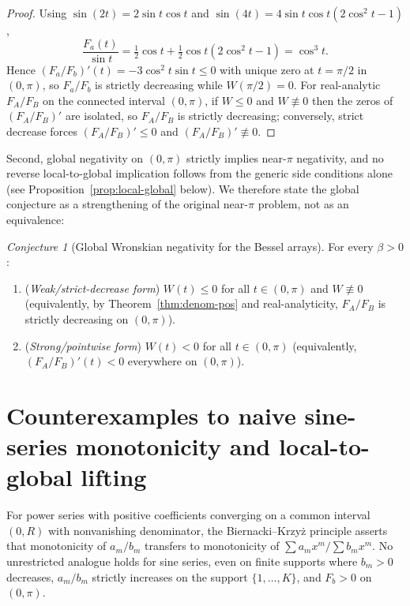 \documentclass[11pt]{article}
\theoremstyle{remark}
\newtheorem{conjecture}[theorem]{Conjecture}
\begin{document}
\begin{proof}
Using $\sin(2t) = 2\sin t\cos t$ and $\sin(4t) = 4\sin t\cos t(2\cos^2 t - 1)$,
\[
\frac{F_a(t)}{\sin t}
= \tfrac{1}{2}\cos t + \tfrac{1}{2}\cos t(2\cos^2 t - 1) = \cos^3 t.
\]
Hence $(F_a/F_b)'(t) = -3\cos^2 t\sin t \le 0$ with unique zero at $t = \pi/2$ in $(0,\pi)$,
so $F_a/F_b$ is strictly decreasing while $W(\pi/2)=0$. For real-analytic $F_A/F_B$ on the
connected interval $(0,\pi)$, if $W \le 0$ and $W \not\equiv 0$ then the zeros of
$(F_A/F_B)'$ are isolated, so $F_A/F_B$ is strictly decreasing; conversely, strict decrease
forces $(F_A/F_B)' \le 0$ and $(F_A/F_B)' \not\equiv 0$.
\end{proof}

Second, global negativity on $(0,\pi)$ strictly implies near-$\pi$ negativity, and no
reverse local-to-global implication follows from the generic side conditions alone (see
Proposition~\ref{prop:local-global} below). We therefore state the global conjecture as a
strengthening of the original near-$\pi$ problem, not as an equivalence:

\begin{conjecture}[Global Wronskian negativity for the Bessel arrays]
\label{conj:main}
For every $\beta > 0$:
\begin{enumerate}
  \item[(a)] (\emph{Weak/strict-decrease form}) $W(t) \le 0$ for all $t \in (0,\pi)$ and
  $W \not\equiv 0$ (equivalently, by Theorem~\ref{thm:denom-pos} and real-analyticity,
  $F_A/F_B$ is strictly decreasing on $(0,\pi)$).
  \item[(b)] (\emph{Strong/pointwise form}) $W(t) < 0$ for all $t \in (0,\pi)$
  (equivalently, $(F_A/F_B)'(t) < 0$ everywhere on $(0,\pi)$).
\end{enumerate}
\end{conjecture}

\section{Counterexamples to naive sine-series monotonicity and local-to-global lifting}
\label{sec:counter}

For power series with positive coefficients converging on a common interval $(0,R)$ with
nonvanishing denominator, the Biernacki--Krzy\.z principle \cite{BK} asserts that
monotonicity of $a_m/b_m$ transfers to monotonicity of $\sum a_m x^m / \sum b_m x^m$.
No unrestricted analogue holds for sine series, even on finite supports where $b_m > 0$
decreases, $a_m/b_m$ strictly increases on the support $\{1,\dots,K\}$, and $F_b > 0$ on
$(0,\pi)$.
\end{document}
